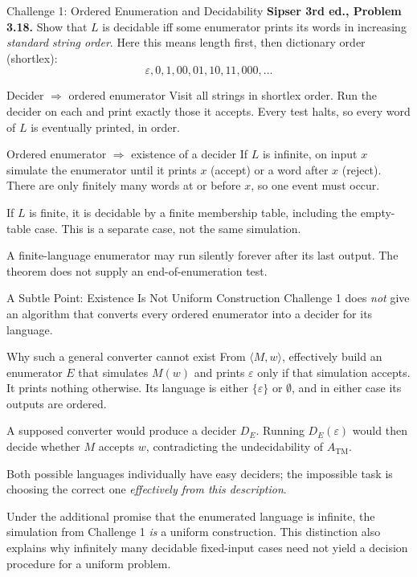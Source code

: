 \documentclass[10pt]{beamer}
\newcommand{\ATM}{A_{\mathrm{TM}}}
\begin{document}
\begin{frame}{Challenge 1: Ordered Enumeration and Decidability}
  \small
  \textbf{Sipser 3rd ed., Problem 3.18.} Show that $L$ is decidable iff
  some enumerator prints its words in increasing \emph{standard string order}.
  Here this means length first, then dictionary order (shortlex):
  \[
    \varepsilon,0,1,00,01,10,11,000,\ldots
  \]
  \begin{block}{Decider $\Rightarrow$ ordered enumerator}
    Visit all strings in shortlex order. Run the decider on each and print
    exactly those it accepts. Every test halts, so every word of $L$
    is eventually printed, in order.
  \end{block}
  \begin{block}{Ordered enumerator $\Rightarrow$ existence of a decider}
    If $L$ is infinite, on input $x$ simulate the enumerator until it prints
    $x$ (accept) or a word after $x$ (reject). There are only finitely many
    words at or before $x$, so one event must occur.
    \par\smallskip
    If $L$ is finite, it is decidable by a finite membership table, including
    the empty-table case. This is a separate case, not the same simulation.
  \end{block}
  A finite-language enumerator may run silently forever after its last
  output. The theorem does not supply an end-of-enumeration test.
\end{frame}

\begin{frame}{A Subtle Point: Existence Is Not Uniform Construction}
  \small
  Challenge 1 does \emph{not} give an algorithm that converts every
  ordered enumerator into a decider for its language.
  \begin{block}{Why such a general converter cannot exist}
    From $\langle M,w\rangle$, effectively build an enumerator $E$ that
    simulates $M(w)$ and prints $\varepsilon$ only if that simulation accepts.
    It prints nothing otherwise. Its language is either
    $\{\varepsilon\}$ or $\emptyset$, and in either case its outputs are ordered.
    \par\smallskip
    A supposed converter would produce a decider $D_E$. Running
    $D_E(\varepsilon)$ would then decide whether $M$ accepts $w$,
    contradicting the undecidability of $\ATM$.
  \end{block}
  Both possible languages individually have easy deciders; the impossible
  task is choosing the correct one \emph{effectively from this description}.
  \par\smallskip
  Under the additional promise that the enumerated language is infinite,
  the simulation from Challenge 1 \emph{is} a uniform construction.
  This distinction also explains why infinitely many decidable fixed-input
  cases need not yield a decision procedure for a uniform problem.
\end{frame}
\end{document}
